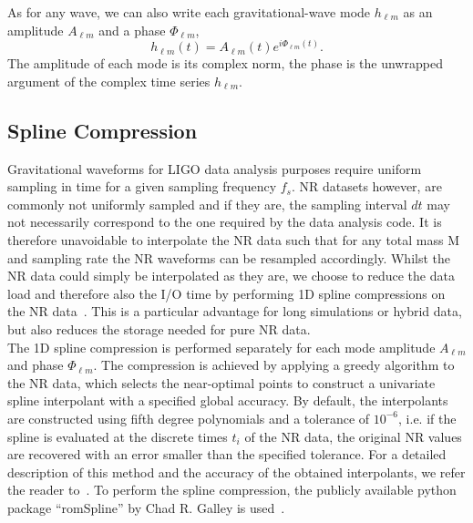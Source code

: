 \documentclass[aps,prd,amssymb,amsmath,amsfonts,superscriptaddress,
floatfix ,preprintnumbers,altaffilletter]{revtex4}
\begin{document}
As for any wave, we can also write each gravitational-wave mode $h_{\ell m}$ as an amplitude $A_{\ell m}$ and a phase
$\Phi_{\ell m}$,
\begin{equation}
\label{ }
h_{\ell m}(t) = A_{\ell m}(t)e^{i\Phi_{\ell m}(t)}.
\end{equation}
The amplitude of each mode is its complex norm, the phase is the unwrapped argument of the complex time series $h_{\ell m}$. 

\subsection{Spline Compression}
\label{sec:spline}
Gravitational waveforms for LIGO data analysis purposes require uniform sampling in time for a given sampling frequency $f_s$.
NR datasets however, are commonly not uniformly sampled and if they are, the sampling interval $dt$ may not necessarily
correspond to the one required by the data analysis code. It is therefore unavoidable to interpolate the NR data such that for any total
mass M and sampling rate the NR waveforms can be resampled accordingly. Whilst the NR data could simply be interpolated as
they are, we choose to reduce the data load and therefore also the I/O time by performing 1D spline compressions on the NR data~\cite{Galley:2015aa}. This is a particular advantage for long simulations or hybrid data, but also reduces the storage needed for pure NR data. \\

The 1D spline compression is performed separately for each mode amplitude $A_{\ell m}$ and phase $\Phi_{\ell m}$. The compression is
achieved by applying a greedy algorithm to the NR data, which selects the near-optimal points to construct a univariate spline interpolant
with a specified global accuracy. By default, the interpolants are constructed using fifth degree polynomials and a tolerance of $10^{-6}$,
i.e. if the spline is evaluated at the discrete times $t_i$ of the NR data, the original NR values are recovered with an error smaller than the
specified tolerance. For a detailed description of this method and the accuracy of the obtained interpolants, we refer the reader to~\cite{}. 
To perform the spline compression, the publicly available python package ``romSpline'' by Chad R. Galley is used~\cite{}. \\
\end{document}
